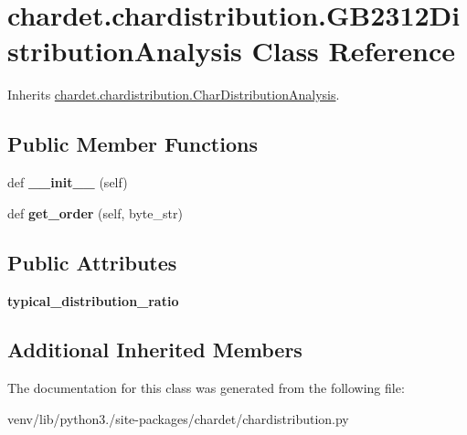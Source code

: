 \hypertarget{classchardet_1_1chardistribution_1_1_g_b2312_distribution_analysis}{}\section{chardet.\+chardistribution.\+G\+B2312\+Distribution\+Analysis Class Reference}
\label{classchardet_1_1chardistribution_1_1_g_b2312_distribution_analysis}


Inherits \hyperlink{classchardet_1_1chardistribution_1_1_char_distribution_analysis}{chardet.\+chardistribution.\+Char\+Distribution\+Analysis}.

\subsection*{Public Member Functions}
\begin{DoxyCompactItemize}
\item 
\mbox{\label{classchardet_1_1chardistribution_1_1_g_b2312_distribution_analysis_aad4eab6936a2935540a8d46c94a91cd5}} 
def {\bfseries \+\_\+\+\_\+init\+\_\+\+\_\+} (self)
\item 
\mbox{\label{classchardet_1_1chardistribution_1_1_g_b2312_distribution_analysis_a2f85915f34e0bb648d540c163290818f}} 
def {\bfseries get\+\_\+order} (self, byte\+\_\+str)
\end{DoxyCompactItemize}
\subsection*{Public Attributes}
\begin{DoxyCompactItemize}
\item 
\mbox{\label{classchardet_1_1chardistribution_1_1_g_b2312_distribution_analysis_a8461328d6e65d88abd5826218a66da48}} 
{\bfseries typical\+\_\+distribution\+\_\+ratio}
\end{DoxyCompactItemize}
\subsection*{Additional Inherited Members}


The documentation for this class was generated from the following file\+:\begin{DoxyCompactItemize}
\item 
venv/lib/python3./site-\/packages/chardet/chardistribution.\+py\end{DoxyCompactItemize}
